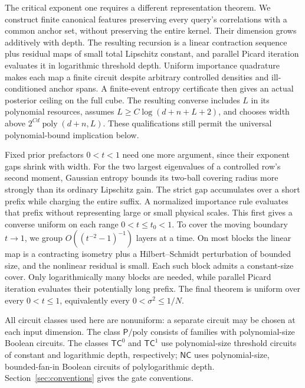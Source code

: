 \documentclass[11pt]{article}
\theoremstyle{remark}
\newcommand{\poly}{\operatorname{poly}}
\newcommand{\TC}{\mathsf{TC}}
\newcommand{\NC}{\mathsf{NC}}
\newcommand{\Ppoly}{\mathsf{P}/\mathrm{poly}}
\begin{document}
The critical exponent one requires a different representation theorem.
We construct finite canonical features preserving every query's
correlations with a common anchor set, without preserving the entire
kernel. Their dimension grows additively with depth. The resulting
recursion is a linear contraction sequence plus residual maps of small
total Lipschitz constant, and parallel Picard iteration evaluates it in
logarithmic threshold depth. Uniform importance quadrature makes each
map a finite circuit despite arbitrary controlled densities and
ill-conditioned anchor spans. A finite-event entropy certificate then
gives an actual posterior ceiling on the full cube. The resulting
converse includes $L$ in its polynomial resources, assumes
$L\ge C\log(d+n+L+2)$, and chooses width above
$2^{Cd}\poly(d+n,L)$. These qualifications still permit the universal
polynomial-bound implication below.

Fixed prior prefactors $0<t<1$ need one more argument, since their exponent
gaps shrink with width. For the two largest eigenvalues of a
controlled row's second moment, Gaussian entropy bounds its
two-ball covering radius more strongly than its ordinary Lipschitz
gain. The strict gap accumulates over a short prefix while charging
the entire suffix. A normalized importance rule evaluates that
prefix without representing large or small physical scales.
This first gives a converse uniform on each range $0<t\le t_0<1$.
To cover the moving boundary $t\to1$, we group
$O((t^{-2}-1)^{-1})$ layers at a time. On most blocks the linear
map is a contracting isometry plus a Hilbert--Schmidt perturbation
of bounded size, and the nonlinear residual is small. Each such
block admits a constant-size cover. Only logarithmically many
blocks are needed, while parallel Picard iteration evaluates their
potentially long prefix. The final theorem is uniform over every
$0<t\le1$, equivalently every $0<\sigma^2\le1/N$.

All circuit classes used here are nonuniform: a separate circuit may
be chosen at each input dimension. The class $\Ppoly$ consists of
families with polynomial-size Boolean circuits. The classes $\TC^0$
and $\TC^1$ use polynomial-size threshold circuits of constant and
logarithmic depth, respectively; $\NC$ uses polynomial-size,
bounded-fan-in Boolean circuits of polylogarithmic depth. Section~\ref{sec:conventions}
gives the gate conventions.
\end{document}
